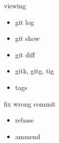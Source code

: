 \documentclass{beamer}
\begin{document}
\begin{frame}{viewing}
  \begin{itemize}
    \item git log
    \item git show
    \item git diff
    \item gitk, gitg, tig
    \item tags
  \end{itemize}
\end{frame}
%

\begin{frame}{fix wrong commit}
  \begin{itemize}
    \item rebase
    \item ammend
  \end{itemize}
\end{frame}
\end{document}
